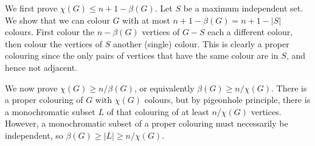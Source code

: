 We first prove $\chi(G)\le n+1-\beta(G)$. Let $S$ be a maximum
independent set. We show that we can colour $G$ with at most
$n+1-\beta(G)=n+1-|S|$ colours. First colour the $n-\beta(G)$
vertices of $G-S$ each a different colour, then colour 
the vertices of $S$ another (single) colour. This is clearly
a proper colouring since the only pairs of vertices that have
the same colour are in $S$, and hence not adjacent.

We now prove $\chi(G) \ge n/\beta(G)$, or equivalently $\beta(G) \ge n/\chi(G)$.
There is a proper colouring of $G$ with $\chi(G)$ colours, but by
pigeonhole principle, there is a monochromatic subset $L$ of that colouring
of at least $n/\chi(G)$ vertices. However, a monochromatic subset of
a proper colouring must necessarily be independent, so
	$\beta(G) \ge |L| \ge n/\chi(G)$.
